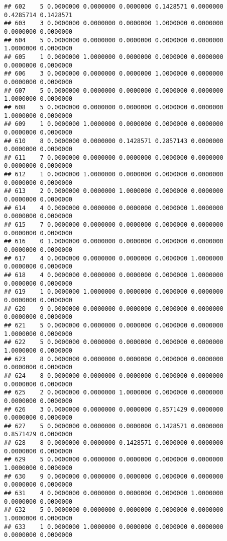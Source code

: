 \documentclass[
]{article}
\begin{document}
\begin{verbatim}
## 602    5 0.0000000 0.0000000 0.0000000 0.1428571 0.0000000 0.4285714 0.1428571
## 603    3 0.0000000 0.0000000 0.0000000 1.0000000 0.0000000 0.0000000 0.0000000
## 604    5 0.0000000 0.0000000 0.0000000 0.0000000 0.0000000 1.0000000 0.0000000
## 605    1 0.0000000 1.0000000 0.0000000 0.0000000 0.0000000 0.0000000 0.0000000
## 606    3 0.0000000 0.0000000 0.0000000 1.0000000 0.0000000 0.0000000 0.0000000
## 607    5 0.0000000 0.0000000 0.0000000 0.0000000 0.0000000 1.0000000 0.0000000
## 608    5 0.0000000 0.0000000 0.0000000 0.0000000 0.0000000 1.0000000 0.0000000
## 609    1 0.0000000 1.0000000 0.0000000 0.0000000 0.0000000 0.0000000 0.0000000
## 610    8 0.0000000 0.0000000 0.1428571 0.2857143 0.0000000 0.0000000 0.0000000
## 611    7 0.0000000 0.0000000 0.0000000 0.0000000 0.0000000 0.0000000 0.0000000
## 612    1 0.0000000 1.0000000 0.0000000 0.0000000 0.0000000 0.0000000 0.0000000
## 613    2 0.0000000 0.0000000 1.0000000 0.0000000 0.0000000 0.0000000 0.0000000
## 614    4 0.0000000 0.0000000 0.0000000 0.0000000 1.0000000 0.0000000 0.0000000
## 615    7 0.0000000 0.0000000 0.0000000 0.0000000 0.0000000 0.0000000 0.0000000
## 616    0 1.0000000 0.0000000 0.0000000 0.0000000 0.0000000 0.0000000 0.0000000
## 617    4 0.0000000 0.0000000 0.0000000 0.0000000 1.0000000 0.0000000 0.0000000
## 618    4 0.0000000 0.0000000 0.0000000 0.0000000 1.0000000 0.0000000 0.0000000
## 619    1 0.0000000 1.0000000 0.0000000 0.0000000 0.0000000 0.0000000 0.0000000
## 620    9 0.0000000 0.0000000 0.0000000 0.0000000 0.0000000 0.0000000 0.0000000
## 621    5 0.0000000 0.0000000 0.0000000 0.0000000 0.0000000 1.0000000 0.0000000
## 622    5 0.0000000 0.0000000 0.0000000 0.0000000 0.0000000 1.0000000 0.0000000
## 623    8 0.0000000 0.0000000 0.0000000 0.0000000 0.0000000 0.0000000 0.0000000
## 624    8 0.0000000 0.0000000 0.0000000 0.0000000 0.0000000 0.0000000 0.0000000
## 625    2 0.0000000 0.0000000 1.0000000 0.0000000 0.0000000 0.0000000 0.0000000
## 626    3 0.0000000 0.0000000 0.0000000 0.8571429 0.0000000 0.0000000 0.0000000
## 627    5 0.0000000 0.0000000 0.0000000 0.1428571 0.0000000 0.8571429 0.0000000
## 628    8 0.0000000 0.0000000 0.1428571 0.0000000 0.0000000 0.0000000 0.0000000
## 629    5 0.0000000 0.0000000 0.0000000 0.0000000 0.0000000 1.0000000 0.0000000
## 630    9 0.0000000 0.0000000 0.0000000 0.0000000 0.0000000 0.0000000 0.0000000
## 631    4 0.0000000 0.0000000 0.0000000 0.0000000 1.0000000 0.0000000 0.0000000
## 632    5 0.0000000 0.0000000 0.0000000 0.0000000 0.0000000 1.0000000 0.0000000
## 633    1 0.0000000 1.0000000 0.0000000 0.0000000 0.0000000 0.0000000 0.0000000

\end{verbatim}
\end{document}
